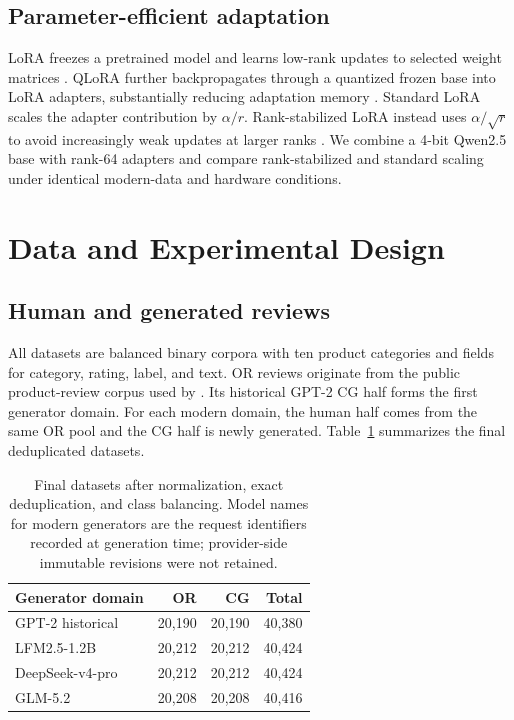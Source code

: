 \documentclass[utf8]{FrontiersinHarvard}
\begin{document}
\subsection{Parameter-efficient adaptation}

LoRA freezes a pretrained model and learns low-rank updates to selected weight matrices \citep{Hu2022}. QLoRA further backpropagates through a quantized frozen base into LoRA adapters, substantially reducing adaptation memory \citep{Dettmers2023}. Standard LoRA scales the adapter contribution by $\alpha/r$. Rank-stabilized LoRA instead uses $\alpha/\sqrt{r}$ to avoid increasingly weak updates at larger ranks \citep{Kalajdzievski2023}. We combine a 4-bit Qwen2.5 base \citep{Qwen2024} with rank-64 adapters and compare rank-stabilized and standard scaling under identical modern-data and hardware conditions.

\section{Data and Experimental Design}

\subsection{Human and generated reviews}

All datasets are balanced binary corpora with ten product categories and fields for category, rating, label, and text. OR reviews originate from the public product-review corpus used by \citet{Salminen2022}. Its historical GPT-2 CG half forms the first generator domain. For each modern domain, the human half comes from the same OR pool and the CG half is newly generated. Table~\ref{tab:data} summarizes the final deduplicated datasets.

\begin{table}[h!]
\centering
\caption{Final datasets after normalization, exact deduplication, and class balancing. Model names for modern generators are the request identifiers recorded at generation time; provider-side immutable revisions were not retained.}
\label{tab:data}
\begin{tabular}{lrrr}
\toprule
Generator domain & OR & CG & Total \\
\midrule
GPT-2 historical & 20,190 & 20,190 & 40,380 \\
LFM2.5-1.2B & 20,212 & 20,212 & 40,424 \\
DeepSeek-v4-pro & 20,212 & 20,212 & 40,424 \\
GLM-5.2 & 20,208 & 20,208 & 40,416 \\
\bottomrule
\end{tabular}
\end{table}
\end{document}
